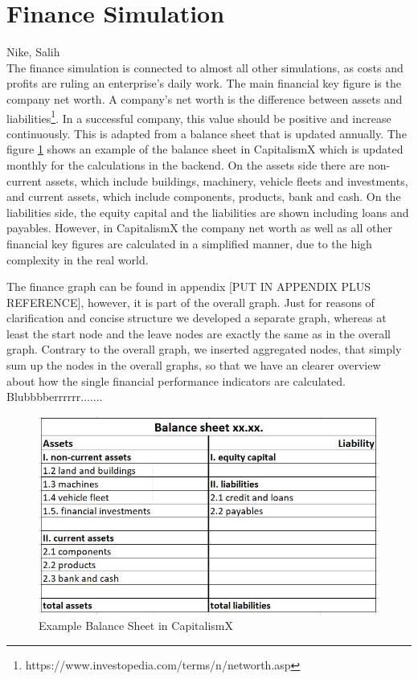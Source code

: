 \section{Finance Simulation}
\label{sec:finance_simulation}
Nike, Salih\\

The finance simulation is connected to almost all other simulations, as costs and profits are ruling an enterprise's daily work. The main financial key figure is the company net worth. A company's net worth is the difference between assets and liabilities\footnote{https://www.investopedia.com/terms/n/networth.asp}. In a successful company, this value should be positive and increase continuously. This is adapted from a balance sheet that is updated annually. The figure \ref{fig:BalanceSheet} shows an example of the balance sheet in CapitalismX which is updated monthly for the calculations in the backend. On the assets side there are non-current assets, which include buildings, machinery, vehicle fleets and investments, and current assets, which include components, products, bank and cash. On the liabilities side, the equity capital and the liabilities are shown including loans and payables. However, in CapitalismX the company net worth as well as all other financial key figures are calculated in a simplified manner, due to the high complexity in the real world.

The finance graph can be found in appendix [PUT IN APPENDIX PLUS REFERENCE], however, it is part of the overall graph. Just for reasons of clarification and concise structure we developed a separate graph, whereas at least the start node and the leave nodes are exactly the same as in the overall graph. Contrary to the overall graph, we inserted aggregated nodes, that simply sum up the nodes in the overall graphs, so that we have an clearer overview about how the single financial performance indicators are calculated. Blubbbberrrrrr.......


\begin{figure}
\label{fig:BalanceSheet}
	\centering
	\includegraphics[width=12cm]{images/balance sheet.JPG}
	\caption{Example Balance Sheet in CapitalismX}
\end{figure}

